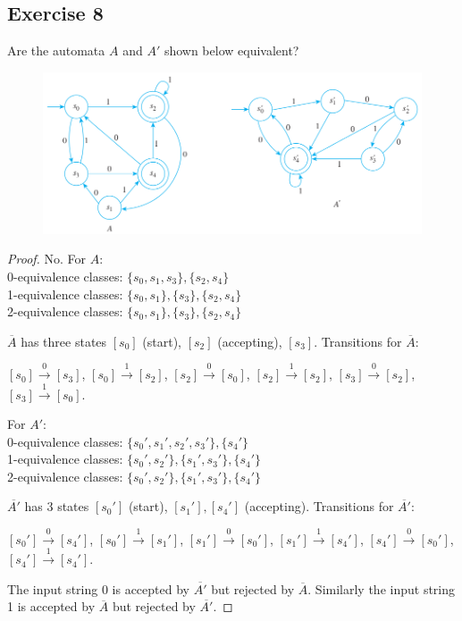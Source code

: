 \documentclass[14pt]{extarticle}
\begin{document}
\subsection{Exercise 8}
Are the automata \(A\) and \(A'\) shown below equivalent?

\begin{figure}[ht!]
\centering
\includegraphics[scale=0.5]{../images/12.3.8.png}
\end{figure}

\begin{proof}
No. For \(A\): \\
0-equivalence classes: \(\{s_0, s_1, s_3\}, \{s_2, s_4\}\) \\
1-equivalence classes: \(\{s_0, s_1\}, \{s_3\}, \{s_2, s_4\}\) \\
2-equivalence classes: \(\{s_0, s_1\}, \{s_3\}, \{s_2, s_4\}\) 

\(\overline{A}\) has three states \([s_0]\) (start), \([s_2]\) (accepting), \([s_3]\). Transitions for \(\overline{A}\): 

\([s_0] \overset{0}{\to} [s_3]\), \([s_0] \overset{1}{\to} [s_2]\), \([s_2] \overset{0}{\to} [s_0]\), 
\([s_2] \overset{1}{\to} [s_2]\), \([s_3] \overset{0}{\to} [s_2]\), \([s_3] \overset{1}{\to} [s_0]\).

For \(A'\): \\
0-equivalence classes: \(\{s_0', s_1', s_2', s_3'\}, \{s_4'\}\) \\
1-equivalence classes: \(\{s_0', s_2'\}, \{s_1', s_3'\}, \{s_4'\}\) \\
2-equivalence classes: \(\{s_0', s_2'\}, \{s_1', s_3'\}, \{s_4'\}\)

\(\overline{A'}\) has 3 states \([s_0']\) (start), \([s_1'],[s_4']\) (accepting). Transitions for \(\overline{A'}\): 

\([s_0'] \overset{0}{\to} [s_4']\), \([s_0'] \overset{1}{\to} [s_1']\), \([s_1'] \overset{0}{\to} [s_0']\), 
\([s_1'] \overset{1}{\to} [s_4']\), \([s_4'] \overset{0}{\to} [s_0']\), \([s_4'] \overset{1}{\to} [s_4']\).

The input string 0 is accepted by \(\overline{A'}\) but rejected by \(\overline{A}\). Similarly the input string 1 is 
accepted by \(\overline{A}\) but rejected by \(\overline{A'}\).
\end{proof}
\end{document}
